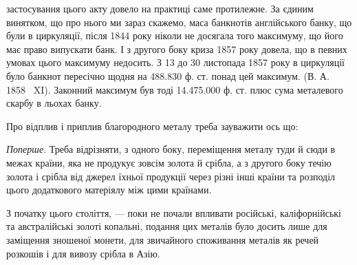 \parcont{}  %
застосування цього акту довело на практиці саме протилежне. За єдиним винятком,
що про нього ми зараз скажемо, маса банкнотів англійського банку,
що були в циркуляції, після 1844 року ніколи не досягала того максимуму, що
його має право випускати банк. І з другого боку криза 1857 року довела, що
в певних умовах цього максимуму недосить. З 13 до 30 листопада 1857 року
в циркуляції було банкнот пересічно щодня на \num{488.830} ф. ст. понад цей
максимум. (В. А. 1858~ XI). Законний максимум був тоді \num{14.475.000} ф. ст.
плюс сума металевого скарбу в льохах банку.

Про відплив і приплив благородного металу треба зауважити ось що:

\emph{Поперше}. Треба відрізняти, з одного боку, переміщення металу туди
й сюди в межах країни, яка не продукує зовсім золота й срібла, а з другого
боку течію золота і срібла від джерел їхньої продукції через різні інші країни
та розподіл цього додаткового матеріялу між цими країнами.

З початку цього століття, — поки не почали впливати російські, каліфорнійські
та австралійські золоті копальні, подання цих металів було досить лише
для заміщення зношеної монети, для звичайного споживання металів як речей
розкошів і для вивозу срібла в Азію.

